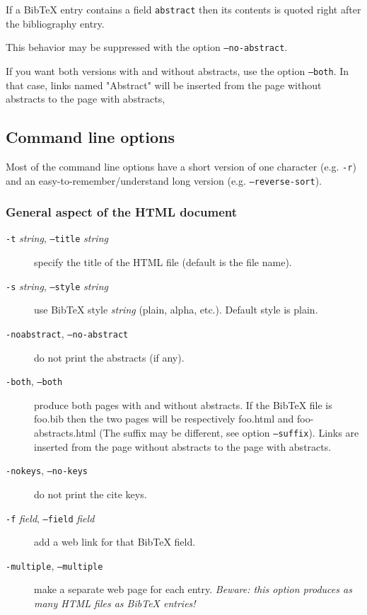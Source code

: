 \documentclass[11pt,a4paper]{article}
\begin{document}
If a BibTeX entry contains a field \texttt{abstract} then its contents
is quoted right after the bibliography entry.

This behavior may be suppressed with the option \texttt{--no-abstract}.

If you want both versions with and without abstracts, use the option
\texttt{--both}. In that case, links named "Abstract" will be
inserted from the page without abstracts to the page with abstracts,


\subsection{Command line options}

Most of the command line options have a short version of one character
(e.g. \texttt{-r}) and an easy-to-remember/understand long version 
(e.g. \texttt{--reverse-sort}).

\subsubsection{General aspect of the HTML document}

\begin{description}
  
\item[\texttt{-t} \textit{string}, \texttt{--title} \textit{string}]
  specify the title of the HTML file (default is the file name).

  
\item[\texttt{-s} \textit{string}, \texttt{--style} \textit{string}]
  use BibTeX style \textit{string} (plain, alpha, etc.).  Default
  style is plain.

  
\item[\texttt{-noabstract}, \texttt{--no-abstract}] do not print the
  abstracts (if any).

  
\item[\texttt{-both}, \texttt{--both}] produce both pages with and
  without abstracts. If the BibTeX file is foo.bib then the two pages
  will be respectively foo.html and foo-abstracts.html (The suffix may
  be different, see option \texttt{--suffix}). Links are inserted from
  the page without abstracts to the page with abstracts.

  
\item[\texttt{-nokeys}, \texttt{--no-keys}] do not print the cite
  keys.

  
\item[\texttt{-f} \textit{field}, \texttt{--field} \textit{field}] add
  a web link for that BibTeX field.

  
\item[\texttt{-multiple}, \texttt{--multiple}] make a separate web
  page for each entry.  \textit{Beware: this option produces as many
    HTML files as BibTeX entries!}


\end{description}
\end{document}
